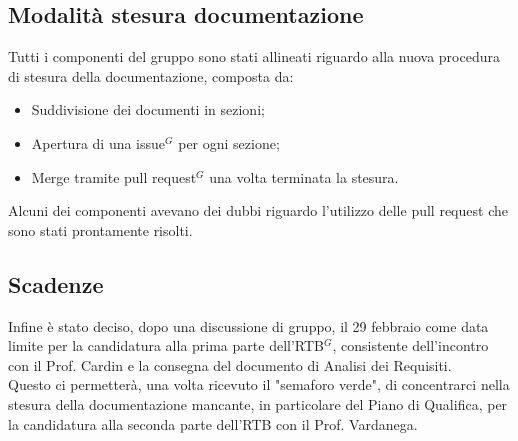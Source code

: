 \documentclass[a4paper, 11pt]{article}
\begin{document}
\subsection{Modalità stesura documentazione}
Tutti i componenti del gruppo sono stati allineati riguardo alla nuova procedura di stesura della documentazione, composta da: 
\begin{itemize}
    \item Suddivisione dei documenti in sezioni;
    \item Apertura di una issue$^{G}$ per ogni sezione;
    \item Merge tramite pull request$^{G}$ una volta terminata la stesura.
\end{itemize}

Alcuni dei componenti avevano dei dubbi riguardo l'utilizzo delle pull request che sono stati prontamente risolti.

\subsection{Scadenze}
Infine è stato deciso, dopo una discussione di gruppo, il 29 febbraio come data limite per la candidatura alla prima parte dell'RTB$^{G}$, consistente dell'incontro con il Prof. Cardin e la consegna del documento di Analisi dei Requisiti. \\
Questo ci permetterà, una volta ricevuto il "semaforo verde", di concentrarci nella stesura della documentazione mancante, in particolare del Piano di Qualifica, per la candidatura alla seconda parte dell'RTB con il Prof. Vardanega.
\end{document}

